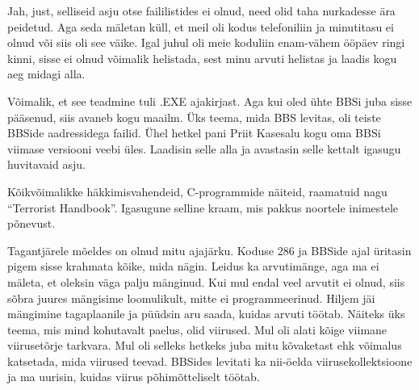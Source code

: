 
Jah, just, selliseid asju otse faililistides ei olnud, need olid taha 
nurkadesse ära peidetud. Aga seda mäletan küll, et meil oli kodus 
telefoniliin ja minutitasu ei olnud või siis 
oli see väike. Igal juhul oli meie koduliin enam-vähem
ööpäev ringi kinni, sisse ei olnud võimalik helistada, sest minu 
arvuti helistas ja laadis kogu aeg midagi alla.


Võimalik, et see teadmine tuli .EXE ajakirjast. Aga kui oled ühte BBSi juba sisse pääsenud, siis avaneb kogu 
maailm. Üks teema, mida BBS levitas, oli teiste BBSide 
aadressidega failid. Ühel hetkel pani Priit Kasesalu 
kogu oma BBSi viimase versiooni veebi üles. Laadisin selle alla ja 
avastasin selle kettalt igasugu huvitavaid asju. 


Kõikvõimalikke häkkimisvahendeid, C-programmide näiteid, raamatuid 
nagu \enquote{Terrorist Handbook}. Igasugune 
selline kraam, mis pakkus noortele inimestele põnevust.


Tagantjärele mõeldes on olnud mitu ajajärku. Koduse 286 ja BBSide ajal üritasin pigem 
sisse krahmata kõike, mida nägin. Leidus ka 
arvutimänge, aga ma ei mäleta, et oleksin väga palju mänginud. 
Kui mul endal veel arvutit ei olnud, siis sõbra juures mängisime loomulikult, 
mitte ei programmeerinud. Hiljem jäi mängimine tagaplaanile ja püüdsin
aru saada, kuidas arvuti töötab. Näiteks üks teema, mis mind 
kohutavalt paelus, olid viirused. Mul oli alati kõige viimane viirusetõrje 
tarkvara. Mul oli selleks hetkeks juba mitu kõvaketast ehk 
võimalus katsetada, mida viirused teevad. BBSides levitati ka nii-öelda 
viirusekollektsioone ja ma uurisin, kuidas viirus 
põhimõtteliselt töötab. 

